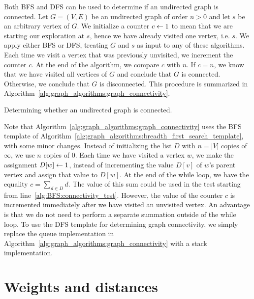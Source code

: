 Both BFS and DFS can be used to determine if an
undirected graph is connected. Let $G = (V, E)$ be an undirected graph
of order $n > 0$ and let $s$ be an arbitrary vertex of $G$. We
initialize a counter $c \leftarrow 1$ to mean that we are starting our
exploration at $s$, hence we have already visited one vertex,
i.e. $s$. We apply either BFS or DFS, treating
$G$ and $s$ as input to any of these algorithms. Each time we visit a
vertex that was previously unvisited, we increment the counter $c$. At
the end of the algorithm, we compare $c$ with $n$. If $c = n$, we know
that we have visited all vertices of $G$ and conclude that $G$ is
connected. Otherwise, we conclude that $G$ is disconnected. This
procedure is summarized in
Algorithm~\ref{alg:graph_algorithms:graph_connectivity}.

\begin{algorithm}[!htpb]

\caption{Determining whether an undirected graph is connected.}
\label{alg:graph_algorithms:graph_connectivity}
\end{algorithm}

Note that Algorithm~\ref{alg:graph_algorithms:graph_connectivity} uses
the BFS template of
Algorithm~\ref{alg:graph_algorithms:breadth_first_search_template},
with some minor changes. Instead of initializing the list $D$ with
$n = |V|$ copies of $\infty$, we use $n$ copies of $0$. Each time we
have visited a vertex $w$, we make the assignment $D[w] \leftarrow 1$,
instead of incrementing the value $D[v]$ of $w$'s parent vertex and
assign that value to $D[w]$. At the end of the while loop, we have the
equality $c = \sum_{d \in D} d$. The value of this sum could be used
in the test starting from line~\ref{alg:BFS:connectivity_test}.
However, the value of the counter $c$ is incremented immediately after
we have visited an unvisited vertex. An advantage is that we do not
need to perform a separate summation outside of the while loop. To use
the DFS template for determining graph
connectivity, we simply replace the
queue implementation in
Algorithm~\ref{alg:graph_algorithms:graph_connectivity} with a
stack implementation.



\section{Weights and distances}
\label{sec:graph_algorithms:weights_distances}

